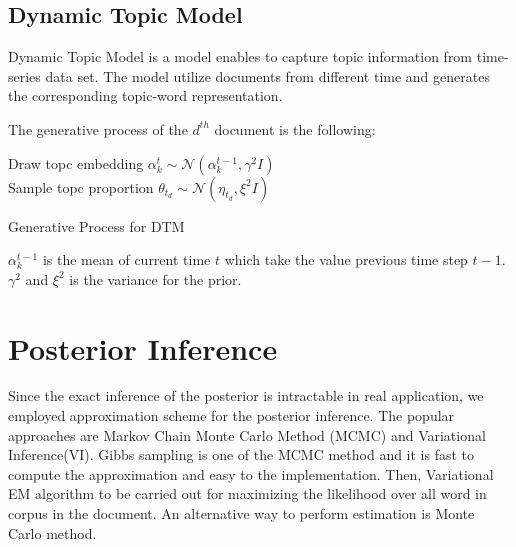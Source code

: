 \subsection{Dynamic Topic Model}
Dynamic Topic Model \cite{blei_dynamic_2006} is a model enables to capture topic information from time-series data set. The model utilize documents from different time and generates the corresponding topic-word representation.

The generative process of the $ d^{th} $ document is the following:\\
\begin{algorithm}[H]
Draw topc embedding $ \alpha_k^t\sim\mathcal{N}(\alpha_k^{t-1},\gamma^2I) $\\
Sample topc proportion $ \theta_{t_d}\sim\mathcal{N}(\eta_{t_d},\xi^2I) $\\
\caption{Generative Process for DTM}
\label{algorithm:dtm}
\end{algorithm}
$\alpha_k^{t-1}$ is the mean of current time $ t $ which take the value previous time step $ t-1 $.
$ \gamma^2 $ and $ \xi^2 $ is the variance for the prior.
\section{Posterior Inference}\label{ch4:1}
Since the exact inference of the posterior is intractable in real application, we employed approximation scheme for the posterior inference. The popular approaches are Markov Chain Monte Carlo Method (MCMC) and Variational Inference(VI)\cite{blei_variational_2006,hoffman_stochastic_2013}. Gibbs sampling is one of the MCMC method and it is fast to compute the approximation and easy to the implementation. Then, Variational EM algorithm to be carried out for maximizing the likelihood over all word in corpus in the document. An alternative way to perform estimation is Monte Carlo method.

